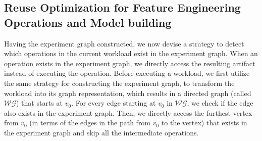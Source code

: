 \subsection{Reuse Optimization for Feature Engineering Operations and Model building}
Having the experiment graph constructed, we now devise a strategy to detect which operations in the current workload exist in the experiment graph.
When an operation exists in the experiment graph, we directly access the resulting artifact instead of executing the operation.
Before executing a workload, we first utilize the same strategy for constructing the experiment graph, to transform the workload into its graph representation, which results in a directed graph (called $\mathcal{WG}$) that starts at $v_0$.
For every edge starting at $v_0$ in $\mathcal{WG}$, we check if the edge also exists in the experiment graph.
Then, we directly access the furthest vertex from $v_0$ (in terms of the edges in the path from $v_0$ to the vertex) that exists in the experiment graph and skip all the intermediate operations.




